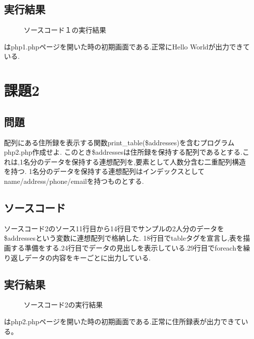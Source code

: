 \documentclass[a4j,10pt]{jsarticle}
\begin{document}
\subsection{実行結果}

\begin{figure}[H]
  \centering
  \caption{ソースコード１の実行結果}
  \label{fig:1}
\end{figure}
はphp1.phpページを開いた時の初期画面である.正常にHello Worldが出力できている.


\section{課題2}
\subsection{問題}


  配列にある住所録を表示する関数print\_table(\$addresses)を含むプログラムphp2.php作成せよ.
  このとき\$addressesは住所録を保持する配列であるとする.これは,1名分のデータを保持する連想配列を,要素として人数分含む二重配列構造を持つ.
  1名分のデータを保持する連想配列はインデックスとしてname/address/phone/emailを持つものとする.



\subsection{ソースコード}

ソースコード2のソース11行目から14行目でサンプルの2人分のデータを\$addressesという変数に連想配列で格納した.
18行目でtableタグを宣言し,表を描画する準備をする.24行目でデータの見出しを表示している.29行目でforeachを繰り返しデータの内容をキーごとに出力している.


\subsection{実行結果}

\begin{figure}[H]
  \centering
  \caption{ソースコード2の実行結果}
  \label{fig:2}
\end{figure}
はphp2.phpページを開いた時の初期画面である.正常に住所録表が出力できている。
\end{document}
